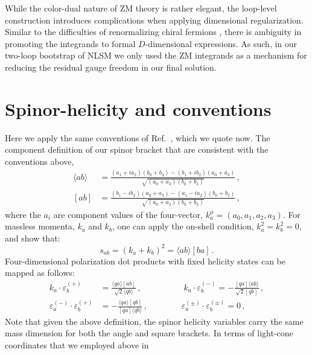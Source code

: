 \documentclass[11pt,letter]{article}
\begin{document}
While the color-dual nature of ZM theory is rather elegant, the
loop-level construction introduces complications when applying
dimensional regularization. Similar to the difficulties of
renormalizing chiral fermions \cite{tHooft:1972tcz}, there is ambiguity
in promoting the integrands to formal $D$-dimensional expressions. As
such, in our two-loop bootstrap of NLSM we only used the ZM
integrands as a mechanism for reducing the residual gauge freedom in
our final solution.

\section{Spinor-helicity and conventions}\label{Conventions}

Here we apply the same conventions of Ref.~\cite{jjmcTASI2014}, which
we quote now. The component definition of our spinor bracket that are
consistent with the conventions above,
\begin{align}
\langle ab \rangle &= \frac{(a_1 + i a_2)(b_0+b_3)-(b_1 + i b_2)(a_0+a_3)}{\sqrt{(a_0+a_3)(b_0+b_3)}}\,,
\\
[ab] &= \frac{(b_1 - i b_2)(a_0+a_3)-(a_1 - i a_2)(b_0+b_3)}{\sqrt{(a_0+a_3)(b_0+b_3)}}\,,
\end{align}
where the $a_i$ are component values of the four-vector,
$k^\mu_a = (a_0,a_1,a_2,a_3)$. For massless momenta, $k_a$ and $k_b$,
one can apply the on-shell condition, $k_a^2=k_b^2=0$, and show that:
\begin{equation}
s_{ab} = (k_a+k_b)^2= \langle ab \rangle[ba]\,.
\end{equation}
Four-dimensional polarization dot products with fixed helicity states
can be mapped as follows:
\begin{equation}\label{eq:4DPols}
\begin{aligned}
k_a \cdot \varepsilon_b^{(+)} &= \frac{\langle q a \rangle[ab]}{\sqrt{2}\langle q b\rangle}\,,
\qquad\quad \qquad
k_a \cdot \varepsilon_b^{(-)} = -\frac{[qa]\langle ab\rangle}{\sqrt{2}[qb]}\,,
\\
\varepsilon_a^{(-)}\cdot \varepsilon_b^{(+)} &= - \frac{\langle q a\rangle [qb]}{ [qa]\langle q b\rangle} \,,
\qquad \qquad
\varepsilon_a^{(\pm)}\cdot \varepsilon_b^{(\pm)} = 0 \,,
\end{aligned}
\end{equation}
Note that given the above definition, the spinor helicity variables
carry the same mass dimension for both the angle and square
brackets. In terms of light-cone coordinates that we employed above in
\end{document}
